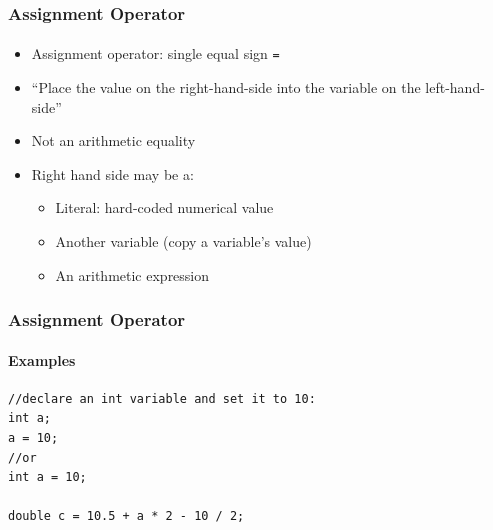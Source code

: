 \documentclass[]{beamer}
\begin{document}

\begin{frame}[fragile]
    \frametitle{Assignment Operator}
    \framesubtitle{}

\begin{itemize}[<+->]
  \item Assignment operator: single equal sign \texttt{=}
  \item ``Place the value on the right-hand-side into the variable on the left-hand-side''
  \item Not an arithmetic equality
  \item Right hand side may be a:
  \begin{itemize}
    \item Literal: hard-coded numerical value
    \item Another variable (copy a variable's value)
    \item An arithmetic expression
  \end{itemize}
\end{itemize}  
\end{frame}

\begin{frame}[fragile]
    \frametitle{Assignment Operator}
    \framesubtitle{Examples}

\begin{verbatim}
//declare an int variable and set it to 10:
int a;
a = 10;
//or
int a = 10;

double c = 10.5 + a * 2 - 10 / 2;
\end{verbatim}

\end{frame}

\end{document}

